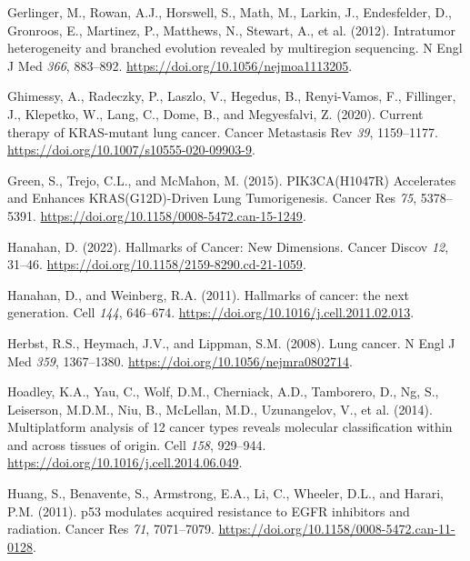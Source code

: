 \begin{CSLReferences}{0}{0}
\leavevmode{}%
Gerlinger, M., Rowan, A.J., Horswell, S., Math, M., Larkin, J., Endesfelder, D., Gronroos, E., Martinez, P., Matthews, N., Stewart, A., et al. (2012). Intratumor heterogeneity and branched evolution revealed by multiregion sequencing. N Engl J Med \emph{366}, 883--892. \url{https://doi.org/10.1056/nejmoa1113205}.

\leavevmode{}%
Ghimessy, A., Radeczky, P., Laszlo, V., Hegedus, B., Renyi-Vamos, F., Fillinger, J., Klepetko, W., Lang, C., Dome, B., and Megyesfalvi, Z. (2020). Current therapy of KRAS-mutant lung cancer. Cancer Metastasis Rev \emph{39}, 1159--1177. \url{https://doi.org/10.1007/s10555-020-09903-9}.

\leavevmode{}%
Green, S., Trejo, C.L., and McMahon, M. (2015). PIK3CA(H1047R) Accelerates and Enhances KRAS(G12D)-Driven Lung Tumorigenesis. Cancer Res \emph{75}, 5378--5391. \url{https://doi.org/10.1158/0008-5472.can-15-1249}.

\leavevmode{}%
Hanahan, D. (2022). Hallmarks of Cancer: New Dimensions. Cancer Discov \emph{12}, 31--46. \url{https://doi.org/10.1158/2159-8290.cd-21-1059}.

\leavevmode{}%
Hanahan, D., and Weinberg, R.A. (2011). Hallmarks of cancer: the next generation. Cell \emph{144}, 646--674. \url{https://doi.org/10.1016/j.cell.2011.02.013}.

\leavevmode{}%
Herbst, R.S., Heymach, J.V., and Lippman, S.M. (2008). Lung cancer. N Engl J Med \emph{359}, 1367--1380. \url{https://doi.org/10.1056/nejmra0802714}.

\leavevmode{}%
Hoadley, K.A., Yau, C., Wolf, D.M., Cherniack, A.D., Tamborero, D., Ng, S., Leiserson, M.D.M., Niu, B., McLellan, M.D., Uzunangelov, V., et al. (2014). Multiplatform analysis of 12 cancer types reveals molecular classification within and across tissues of origin. Cell \emph{158}, 929--944. \url{https://doi.org/10.1016/j.cell.2014.06.049}.

\leavevmode{}%
Huang, S., Benavente, S., Armstrong, E.A., Li, C., Wheeler, D.L., and Harari, P.M. (2011). p53 modulates acquired resistance to EGFR inhibitors and radiation. Cancer Res \emph{71}, 7071--7079. \url{https://doi.org/10.1158/0008-5472.can-11-0128}.


\end{CSLReferences}
